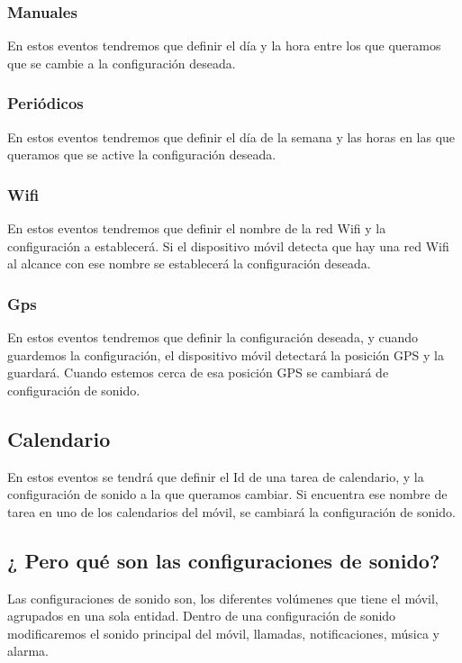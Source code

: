 \subsubsection{Manuales}
En estos eventos tendremos que definir el día y la hora entre los que queramos que se cambie a la configuración deseada.
\subsubsection{Periódicos}
En estos eventos tendremos que definir el día de la semana y las horas en las que queramos que se active la configuración deseada.
\subsubsection{Wifi}
En estos eventos tendremos que definir el nombre de la red Wifi y la configuración a establecerá. Si el dispositivo móvil detecta que hay una red Wifi al alcance con ese nombre se establecerá la configuración deseada.
\subsubsection{Gps}
En estos eventos tendremos que definir la configuración deseada, y cuando guardemos la configuración, el dispositivo móvil detectará la posición GPS y la guardará. Cuando estemos cerca de esa posición GPS se cambiará de configuración de sonido.
\subsection{Calendario}
En estos eventos se tendrá que definir el Id de una tarea de calendario, y la configuración de sonido a la que queramos cambiar. Si encuentra ese nombre de tarea en uno de los calendarios del móvil, se cambiará la configuración de sonido.
\subsection{¿ Pero qué son las configuraciones de sonido?}
Las configuraciones de sonido son, los diferentes volúmenes que tiene el móvil, agrupados en una sola entidad. Dentro de una configuración de sonido modificaremos el sonido principal del móvil, llamadas, notificaciones, música y alarma.


